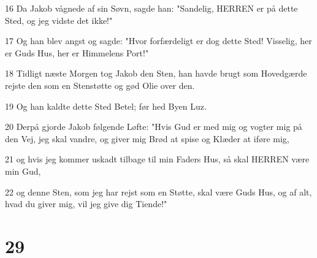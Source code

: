 \par 16 Da Jakob vågnede af sin Søvn, sagde han: "Sandelig, HERREN er på dette Sted, og jeg vidste det ikke!"
\par 17 Og han blev angst og sagde: "Hvor forfærdeligt er dog dette Sted! Visselig, her er Guds Hus, her er Himmelens Port!"
\par 18 Tidligt næste Morgen tog Jakob den Sten, han havde brugt som Hovedgærde rejste den som en Stenstøtte og gød Olie over den.
\par 19 Og han kaldte dette Sted Betel; før hed Byen Luz.
\par 20 Derpå gjorde Jakob følgende Løfte: "Hvis Gud er med mig og vogter mig på den Vej, jeg skal vandre, og giver mig Brød at spise og Klæder at iføre mig,
\par 21 og hvis jeg kommer uskadt tilbage til min Faders Hus, så skal HERREN være min Gud,
\par 22 og denne Sten, som jeg har rejst som en Støtte, skal være Guds Hus, og af alt, hvad du giver mig, vil jeg give dig Tiende!"

\chapter{29}


